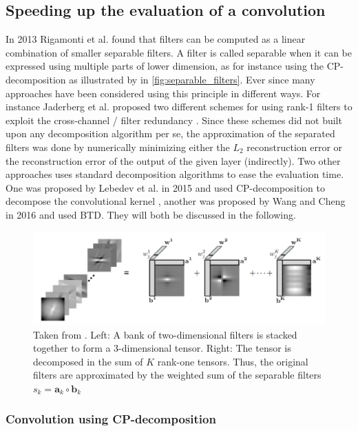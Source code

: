 \subsection{Speeding up the evaluation of a convolution}
In 2013 Rigamonti et al. \cite{Rigamonti2013} found that filters can be computed as a linear combination of smaller separable filters. A filter is called separable when it can be expressed using multiple parts of lower dimension, as for instance using the CP-decomposition as illustrated by \cite{Sironi2015} in \autoref{fig:separable_filters}. Ever since many approaches have been considered using this principle in different ways. For instance Jaderberg et al. proposed two different schemes for using rank-1 filters to exploit the cross-channel / filter redundancy \cite{Jaderberg2014}. Since these schemes did not built upon any decomposition algorithm per se, the approximation of the separated filters was done by numerically minimizing either the $L_2$ reconstruction error or the reconstruction error of the output of the given layer (indirectly). Two other approaches uses standard decomposition algorithms to ease the evaluation time. One was proposed by Lebedev et al. in 2015 and used CP-decomposition to decompose the convolutional kernel \cite{Lebedev2015}, another was proposed by Wang and Cheng in 2016 and used BTD. They will both be discussed in the following.

\begin{figure}
    \centering
    \captionsetup{width=.9\linewidth}
    \includegraphics[width=.8\linewidth]{Pics/03_Previous_work/separable_filters.png}
    \caption{Taken from \cite{Sironi2015}. Left: A bank of two-dimensional filters is stacked together to form a 3-dimensional tensor. Right: The tensor is decomposed in the sum of $K$ rank-one tensors. Thus, the original filters are approximated by the weighted sum of the separable filters $s_k = \boldsymbol{a}_k \circ \boldsymbol{b}_k$}
    \label{fig:separable_filters}
\end{figure}

\subsubsection{Convolution using CP-decomposition} \label{tex:convUsingCP}

